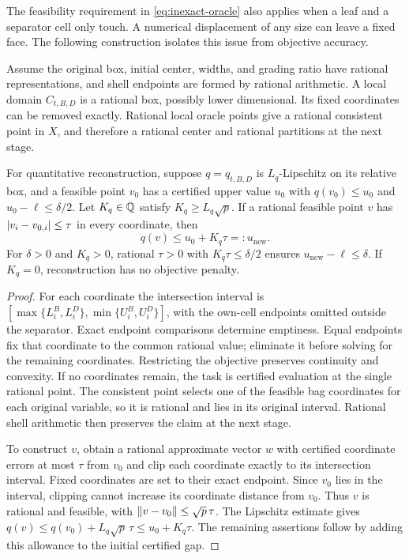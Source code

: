 The feasibility requirement in \eqref{eq:inexact-oracle} also applies
when a leaf and a separator cell only touch.  A numerical displacement
of any size can leave a fixed face.  The following construction isolates
this issue from objective accuracy.

\begin{proposition}
 \label{prop:inexact-reconstruction}
Assume the original box, initial center, widths, and grading ratio have
rational representations, and shell endpoints are formed by rational
arithmetic.  A local domain $C_{t,B,D}$ is a rational box, possibly
lower dimensional.  Its fixed coordinates can be removed exactly.
Rational local oracle points give a rational consistent point in $X$,
and therefore a rational center and rational partitions at the next
stage.

For quantitative reconstruction, suppose $q=q_{t,B,D}$ is
$L_q$-Lipschitz on its relative box, and a feasible point $v_0$ has a
certified upper value $u_0$ with
$q(v_0)\le u_0$ and $u_0-\ell\le\delta/2$.
Let $K_q\in\mathbb Q$ satisfy $K_q\ge L_q\sqrt p$.  If a rational feasible
point $v$ has $\left\lvert v_i-v_{0,i}\right\rvert\le\tau$ in every coordinate, then
\begin{equation}
 q(v)\le u_0+K_q\tau=:u_{\mathrm{new}}.
 \label{eq:inexact-rounding}
\end{equation}
For $\delta>0$ and $K_q>0$, rational $\tau>0$ with
$K_q\tau\le\delta/2$ ensures
$u_{\mathrm{new}}-\ell\le\delta$.  If $K_q=0$, reconstruction has
no objective penalty.
\end{proposition}

\begin{proof}
For each coordinate the intersection interval is
$[\max\{L_i^B,L_i^D\},\min\{U_i^B,U_i^D\}]$, with the own-cell
endpoints omitted outside the separator.  Exact endpoint comparisons
determine emptiness.  Equal endpoints fix that coordinate to the common
rational value; eliminate it before solving for the remaining
coordinates.  Restricting the objective preserves continuity and
convexity.  If no coordinates remain, the task is certified evaluation
at the single rational point.  The consistent point selects one of the
feasible bag coordinates for each original variable, so it is rational
and lies in its original interval.  Rational shell arithmetic then
preserves the claim at the next stage.

To construct $v$, obtain a rational approximate vector $w$ with
certified coordinate errors at most $\tau$ from $v_0$ and clip each
coordinate exactly to its intersection interval.  Fixed coordinates
are set to their exact endpoint.  Since $v_0$ lies in the interval,
clipping cannot increase its coordinate distance from $v_0$.
Thus $v$ is rational and feasible, with
$\left\lVert v-v_0\right\rVert\le\sqrt p\,\tau$.  The Lipschitz estimate gives
$q(v)\le q(v_0)+L_q\sqrt p\,\tau\le u_0+K_q\tau$.
The remaining assertions follow by adding this allowance to the
initial certified gap.
\end{proof}

